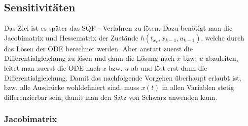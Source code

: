 \subsection{Sensitivitäten}
Das Ziel ist es später das SQP - Verfahren zu lösen. Dazu benötigt man die Jacobimatrix und Hessematrix der Zustände $h(t_{x_k}, x_{k-1}, u_{k-1})$, welche durch das Lösen der ODE berechnet werden. Aber anstatt zuerst die Differentialgleichung zu lösen und dann die Lösung nach $x$ bzw. $u$ abzuleiten, leitet man zuerst die ODE nach $x$ bzw. $u$ ab und löst erst dann die Differentialgleichung. Damit das nachfolgende Vorgehen überhaupt erlaubt ist, bzw. alle Ausdrücke wohldefiniert sind, muss $x(t)$ in allen Variablen stetig differenzierbar sein, damit man den Satz von Schwarz anwenden kann.\\ 

\subsubsection{Jacobimatrix}\label{subsub:Jacobi}

